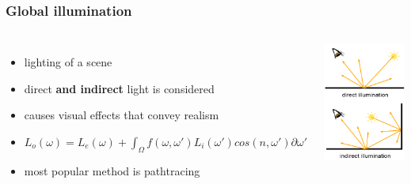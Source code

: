 \documentclass[aspectratio=169]{beamer}
\begin{document}
	\begin{frame}
		\frametitle{Global illumination}
		\begin{columns}
				\begin{itemize}
					\item lighting of a scene
					\item direct \textbf{and indirect} light is considered
					\item causes visual effects that convey realism
					\item $ L_o(\omega) = L_e(\omega) + \int_\Omega f(\omega, \omega')L_i(\omega')cos(n, \omega') \partial \omega' $
					\item most popular method is pathtracing
				\end{itemize}
				\includegraphics[height=.7\textheight]{img/indirect_illumination.png}
		\end{columns}
	\end{frame}
\end{document}
